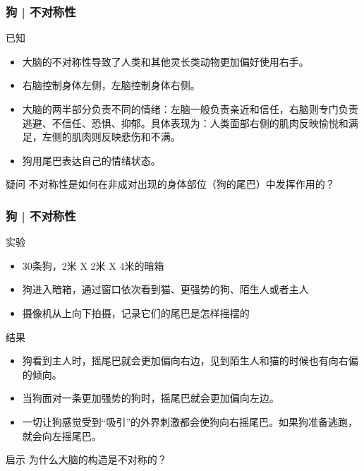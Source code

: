 \begin{frame}
  \frametitle{狗 | 不对称性}
  \begin{block}{已知}
    \begin{itemize}
      \item 大脑的不对称性导致了人类和其他灵长类动物更加偏好使用右手。
      \item 右脑控制身体左侧，左脑控制身体右侧。
      \item 大脑的两半部分负责不同的情绪：左脑一般负责亲近和信任，右脑则专门负责逃避、不信任、恐惧、抑郁。具体表现为：人类面部右侧的肌肉反映愉悦和满足，左侧的肌肉则反映悲伤和不满。
      \item 狗用尾巴表达自己的情绪状态。
    \end{itemize}
  \end{block}
  \pause
  \begin{block}{疑问}
    不对称性是如何在非成对出现的身体部位（狗的尾巴）中发挥作用的？
  \end{block}
\end{frame}

\begin{frame}
  \frametitle{狗 | 不对称性}
  \begin{block}{实验}
    \begin{itemize}
      \item 30条狗，2米 X 2米 X 4米的暗箱
      \item 狗进入暗箱，通过窗口依次看到猫、更强势的狗、陌生人或者主人
      \item 摄像机从上向下拍摄，记录它们的尾巴是怎样摇摆的
    \end{itemize}
  \end{block}
  \vspace{-0.5em}
  \pause
  \begin{block}{结果}
    \begin{itemize}
      \item 狗看到主人时，摇尾巴就会更加偏向右边，见到陌生人和猫的时候也有向右偏的倾向。
      \item 当狗面对一条更加强势的狗时，摇尾巴就会更加偏向左边。
      \item 一切让狗感觉受到“吸引”的外界刺激都会使狗向右摇尾巴。如果狗准备逃跑，就会向左摇尾巴。
    \end{itemize}
  \end{block}
  \vspace{-0.5em}
  \pause
  \begin{block}{启示}
    为什么大脑的构造是不对称的？
  \end{block}
\end{frame}

